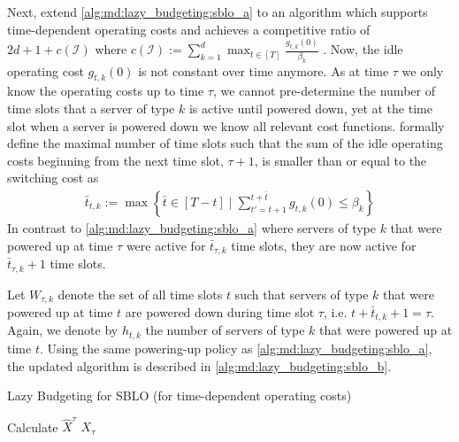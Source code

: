 Next, \citeauthor*{Albers2021_2} extend \autoref{alg:md:lazy_budgeting:sblo_a} to an algorithm which supports time-dependent operating costs and achieves a competitive ratio of $2d + 1 + c(\mathcal{I})$ where $c(\mathcal{I}) := \sum_{k=1}^d \max_{t \in [T]} \frac{g_{t,k}(0)}{\beta_k}$ \cite{Albers2021_2}. Now, the idle operating cost $g_{t,k}(0)$ is not constant over time anymore. As at time $\tau$ we only know the operating costs up to time $\tau$, we cannot pre-determine the number of time slots that a server of type $k$ is active until powered down, yet at the time slot when a server is powered down we know all relevant cost functions. \citeauthor*{Albers2021_2} formally define the maximal number of time slots such that the sum of the idle operating costs beginning from the next time slot, $\tau+1$, is smaller than or equal to the switching cost as \begin{align*}
    \bar{t}_{t,k} := \max \left\{\bar{t} \in [T - t] \mid \sum_{t' = t+1}^{t+\bar{t}} g_{t,k}(0) \leq \beta_k\right\}
\end{align*} In contrast to \autoref{alg:md:lazy_budgeting:sblo_a} where servers of type $k$ that were powered up at time $\tau$ were active for $\bar{t}_{\tau,k}$ time slots, they are now active for $\bar{t}_{\tau,k} + 1$ time slots.

Let $W_{\tau,k}$ denote the set of all time slots $t$ such that servers of type $k$ that were powered up at time $t$ are powered down during time slot $\tau$, i.e. $t + \bar{t}_{t,k} + 1 = \tau$. Again, we denote by $h_{t,k}$ the number of servers of type $k$ that were powered up at time $t$. Using the same powering-up policy as \autoref{alg:md:lazy_budgeting:sblo_a}, the updated algorithm is described in \autoref{alg:md:lazy_budgeting:sblo_b}.

\begin{algorithm}
    \caption{Lazy Budgeting for SBLO (for time-dependent operating costs) \cite{Albers2021_2}}\label{alg:md:lazy_budgeting:sblo_b}
    Calculate $\hat{X}^{\tau}$\;
    \Return $X_{\tau}$\;
\end{algorithm}

